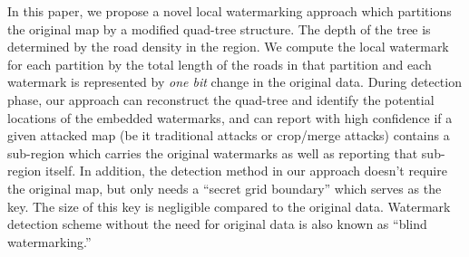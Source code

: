 

In this paper, we propose a novel local watermarking approach which
partitions the original map by a modified quad-tree structure. The depth of
the tree is determined by the road density in the region.
We compute the local watermark for each partition by 
the total length of the roads in that partition and 
each watermark is represented by {\em one bit} change in the original data. 
During detection phase, our approach can reconstruct the quad-tree
and identify the potential locations of the embedded watermarks, and can
report with high confidence if a given attacked map (be it traditional
attacks or crop/merge attacks) contains a sub-region which carries the
original watermarks as well as reporting that sub-region itself. 
In addition, the detection method in our approach
doesn't require the original map,
but only needs a ``secret grid boundary'' which serves as the key. The size
of this key is negligible compared to the original data. Watermark detection
scheme without the need for original data is also known as ``blind
watermarking.''
 
